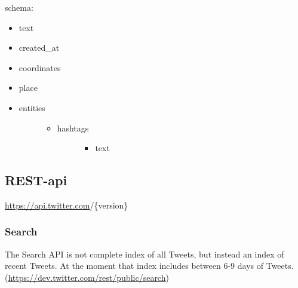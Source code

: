 \documentclass[letterpaper,10pt,english]{sphinxmanual}
\begin{document}
schema:
\begin{itemize}
\item {} 
text

\item {} 
created\_at

\item {} 
coordinates

\item {} 
place

\item {} \begin{description}
\item[{entities}] \leavevmode\begin{itemize}
\item {} \begin{description}
\item[{hashtags}] \leavevmode\begin{itemize}
\item {} 
text

\end{itemize}

\end{description}

\end{itemize}

\end{description}

\end{itemize}


\subsection{REST-api}
\label{twitter:rest-api}
\href{https://api.twitter.com}{https://api.twitter.com}/\{version\}


\subsubsection{Search}
\label{twitter:search}
The Search API is not complete index of all Tweets, but instead an index of recent Tweets.
At the moment that index includes between 6-9 days of Tweets. (\href{https://dev.twitter.com/rest/public/search}{https://dev.twitter.com/rest/public/search})
\end{document}
